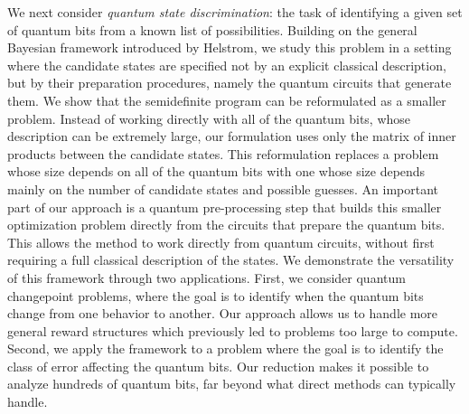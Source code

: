 We next consider \emph{quantum state discrimination}: the task of identifying a given set of quantum bits from a known list of possibilities. 
Building on the general Bayesian framework introduced by Helstrom, we study this problem in a setting where the candidate states are specified not by an explicit classical description, but by their preparation procedures, namely the quantum circuits that generate them.
%
We show that the semidefinite program can be reformulated as a smaller problem.
Instead of working directly with all of the quantum bits, whose description can be extremely large, our formulation uses only the matrix of inner products between the candidate states. 
This reformulation replaces a problem whose size depends on all of the quantum bits with one whose size depends mainly on the number of candidate states and possible guesses.
%
An important part of our approach is a quantum pre-processing step that builds this smaller optimization problem directly from the circuits that prepare the quantum bits. 
This allows the method to work directly from quantum circuits, without first requiring a full classical description of the states.
%
We demonstrate the versatility of this framework through two applications. 
First, we consider quantum changepoint problems, where the goal is to identify when the quantum bits change from one behavior to another. 
Our approach allows us to handle more general reward structures%
 which previously led to problems too large to compute. 
Second, we apply the framework to a problem where the goal is to identify the class of error affecting the quantum bits.
Our reduction makes it possible to analyze hundreds of quantum bits, far beyond what direct methods can typically handle.

